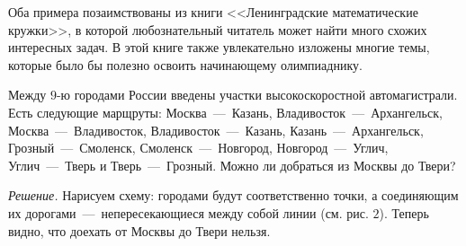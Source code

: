 	Оба примера позаимствованы из книги <<Ленинградские математические кружки>>, в которой любознательный читатель может найти много схожих интересных задач. В этой книге также увлекательно изложены многие темы, которые было бы полезно освоить начинающему олимпиаднику.
\begin{example}
	Между $9$-ю городами России введены участки высокоскоростной автомагистрали. Есть следующие марщруты: Москва~---~Казань, Владивосток~---~Архангельск, Москва~---~Владивосток, Владивосток~---~Казань, Казань~---~Архангельск, Грозный~---~Смоленск, Смоленск~---~Новгород, Новгород~---~Углич, Углич~---~Тверь и Тверь~---~Грозный. Можно ли добраться из Москвы до Твери?

	\emph{Решение.} Нарисуем схему: городами будут соответственно точки, а соединяющим их дорогами~---~непересекающиеся между собой линии (см. рис. $2$). Теперь видно, что доехать от Москвы до Твери нельзя.

\begin{center}
\end{center}
\end{example}

